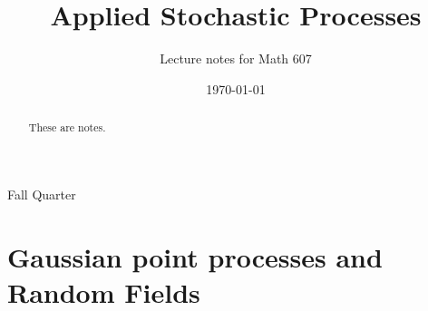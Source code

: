 \documentclass[classnotes]{fillsntsx}
\title{Applied Stochastic Processes}
\subtitle{Lecture notes for Math 607}
\date{\today}
\begin{document}
%


\frontmatter

\begin{abstract}
    These are notes.
\end{abstract}

\maketitle




\mainmatter

\begin{coursenotes}{Fall Quarter}


\chapter{Gaussian point processes and Random Fields}
\lecture
\lecture
\lecture
\lecture
\lecture
\lecture
\lecture
\lecture
\lecture
\lecture
\lecture
\lecture
\lecture
\lecture
\lecture
\lecture
\lecture
\lecture
\end{coursenotes}


\backmatter


%
\end{document}
